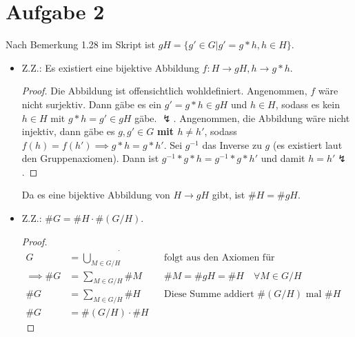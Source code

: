 \documentclass{article}
\begin{document}
	\section*{Aufgabe 2}
	Nach Bemerkung 1.28 im Skript ist $gH = \{g'\in G|g' = g*h, h\in H\}$.
	\begin{itemize}
		\item Z.Z.: Es existiert eine bijektive Abbildung $f:H \to gH, h \to g*h$.
		\begin{proof}
			Die Abbildung ist offensichtlich wohldefiniert. Angenommen, $f$ wäre nicht surjektiv. Dann gäbe es ein $g' = g*h \in gH$ und $h\in H$, sodass es kein $h\in H$ mit $g*h = g' \in gH$ gäbe. $\lightning$.
			Angenommen, die Abbildung wäre nicht injektiv, dann gäbe es $g, g'\in G$ \textbf{mit $h \neq h'$}, sodass $f(h)= f(h') \implies g*h = g*h'$. Sei $g^{-1}$ das Inverse zu $g$ (es existiert laut den Gruppenaxiomen). Dann ist $g^{-1}*g*h = g^{-1} * g *h'$ und damit $h= h'\lightning$.
		\end{proof}
		Da es eine bijektive Abbildung von $H \to gH$ gibt, ist $\# H = \# gH$.
		\item Z.Z.: $\# G = \#H\cdot\#(G/H)$.
		\begin{proof}
			\begin{align*}
				G &= \dot{\bigcup\limits_{M\in G/H}}&&\text{folgt aus den Axiomen für Äquivalenzrelationen}\\
				\implies \#G &= \sum_{M\in G/H} \# M&&\# M = \# gH = \# H\quad  \forall M\in G/H\\
				\#G &= \sum_{M\in G/H} \# H &&\text{Diese Summe addiert $\#(G/H)$ mal $\# H$}\\
				\# G &= \#(G/H) \cdot \# H
			\end{align*}
		\end{proof} 
	\end{itemize}
\end{document}
